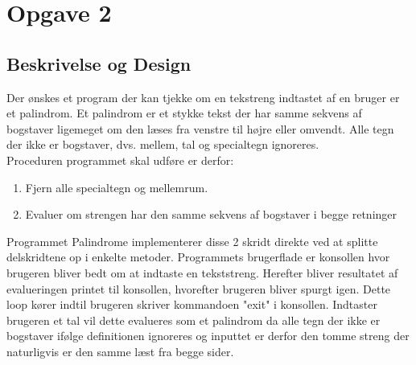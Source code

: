 \section{Opgave 2}
\subsection{Beskrivelse og Design}
	Der ønskes et program der kan tjekke om en tekstreng indtastet af en bruger er et palindrom. Et 	palindrom er et stykke tekst der har samme sekvens af bogstaver ligemeget om den læses fra 			venstre til højre eller omvendt. Alle tegn der ikke er bogstaver, dvs. mellem, tal og 				specialtegn ignoreres. \\
	Proceduren programmet skal udføre er derfor:
	\begin{enumerate}
		\item Fjern alle specialtegn og mellemrum.
		\item Evaluer om strengen har den samme sekvens af bogstaver i begge retninger
	\end{enumerate}
	Programmet Palindrome implementerer disse 2 skridt direkte ved at splitte delskridtene op i enkelte metoder.
	Programmets brugerflade er konsollen hvor brugeren bliver bedt om at indtaste en tekststreng. Herefter bliver resultatet af evalueringen printet til konsollen, hvorefter brugeren bliver spurgt igen. Dette loop kører indtil brugeren skriver kommandoen "exit" i konsollen. Indtaster brugeren et tal vil dette evalueres som et palindrom da alle tegn der ikke er bogstaver ifølge definitionen ignoreres og inputtet er derfor den tomme streng der naturligvis er den samme læst fra begge sider. 
